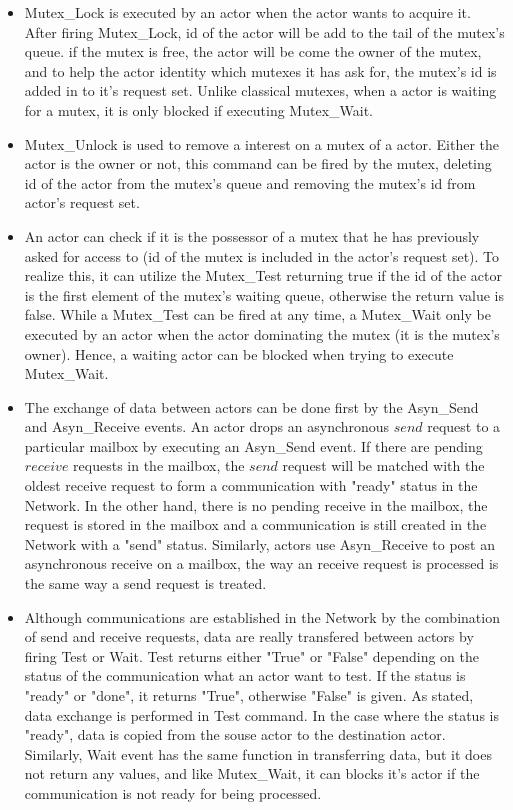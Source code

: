 \documentclass[a4paper,11pt]{article}
\begin{document}
\begin{itemize}[noitemsep]
\setlength{\itemsep}{3pt}
\item Mutex\_Lock is executed by an actor when the actor wants to acquire it. After firing Mutex\_Lock, id of the actor will be add to the tail of the mutex's queue. if the mutex is free, the actor will be come the owner of the mutex, and to help the actor identity which mutexes it has ask for, the mutex's id is added in to it's request set. Unlike classical mutexes, when a actor is waiting for a mutex, it is only blocked if executing Mutex\_Wait. 
\item Mutex\_Unlock is used to remove a interest on a mutex of a actor. Either the actor is the owner or not, this command can be fired by the mutex, deleting id of the actor from the mutex's queue and removing the mutex's id from actor's request set. 
\item An actor can check if it is the possessor of a mutex that he has previously asked for access to (id of the mutex is included in the actor's request set). To realize this, it can utilize the Mutex\_Test returning true if the id of the actor is the first element of the mutex's waiting queue, otherwise the return value is false. While a Mutex\_Test can be fired at any time, a Mutex\_Wait only be executed by an actor when the actor dominating the mutex (it is the mutex's owner). Hence, a waiting actor can be blocked when trying to execute Mutex\_Wait. 
\item The exchange of data between actors can be done first by the  Asyn\_Send and Asyn\_Receive events. An actor drops an asynchronous $send$ request to a particular mailbox by executing an Asyn\_Send event. If there are pending $receive$ requests in the mailbox, the $send$ request will be matched with the oldest receive request to form a communication with "ready" status in the Network. In the other hand, there is no pending receive in the mailbox, the request is stored in the mailbox and a communication is still created in the Network with a "send" status.  Similarly, actors use Asyn\_Receive to post an asynchronous receive on a mailbox, the way an receive request is processed is the same way a send request is treated. 

\item Although communications are established in the Network by the combination of send and receive requests, data are really transfered between actors by firing Test or Wait. Test returns either "True" or "False" depending on the status of the communication what an actor want to test. If the status is "ready" or "done", it returns "True", otherwise "False" is given. As stated, data exchange is performed in Test command. In the case where the status is "ready", data is copied from the souse actor to the destination actor. Similarly, Wait event has the same function in transferring data, but  it does not return any values, and like Mutex\_Wait, it can blocks it's actor if the communication is not ready for being processed.   
\end{itemize}
\end{document}
